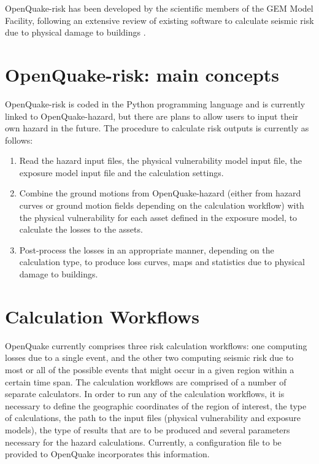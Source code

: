 OpenQuake-risk has been developed by the scientific members of the GEM Model Facility, following an extensive review of existing software to calculate seismic risk due to physical damage to buildings \citep{CrowleyH.2010} . 
%
\section{OpenQuake-risk: main concepts}
OpenQuake-risk is coded in the Python programming language and is currently linked to OpenQuake-hazard, but there are plans to allow users to input their own hazard in the future. The procedure to calculate risk outputs is currently as follows:
\begin{enumerate}

\item Read the hazard input files, the physical vulnerability model input file, the exposure model input file and the calculation settings.

\item Combine the ground motions from OpenQuake-hazard (either from hazard curves or ground motion fields depending on the calculation workflow) with the physical vulnerability for each asset defined in the exposure model, to calculate the losses to the assets.

\item Post-process the losses in an appropriate manner, depending on the calculation type, to produce loss curves, maps and statistics due to physical damage to buildings. 

\end{enumerate}
%
\section{Calculation Workflows}
OpenQuake currently comprises three risk calculation workflows: one computing losses due to a single event, and the other two computing seismic risk due to most or all of the possible events that might occur in a given region within a certain time span. The calculation workflows are comprised of a number of separate calculators. In order to run any of the calculation workflows, it is necessary to define the geographic coordinates of the region of interest, the type of calculations, the path to the input files (physical vulnerability and exposure models), the type of results that are to be produced and several parameters necessary for the hazard calculations. Currently, a configuration file to be provided to OpenQuake incorporates this information.


